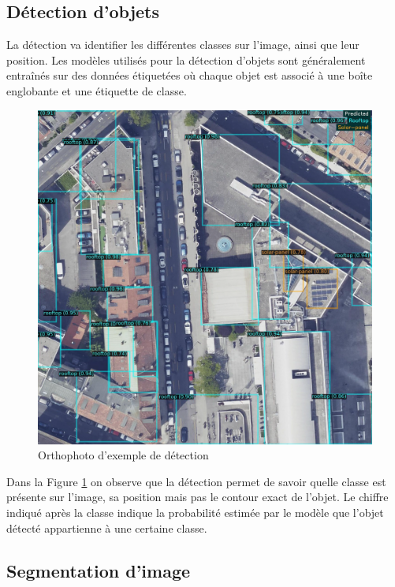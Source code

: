 \subsection{Détection d'objets}
La détection va identifier les différentes classes sur l'image, ainsi que leur position. Les modèles utilisés pour la détection d'objets sont généralement entraînés sur des données étiquetées où chaque objet est associé à une boîte englobante et une étiquette de classe.

\begin{figure}[H]
    \centering
    \includegraphics[width=1\linewidth]{03-tail//A1_fondamentaux_ML//A1_figures/A1_25_detection_hepia.png}
    \caption{Orthophoto d'exemple de détection}
    \label{fig:A1_25_detection_hepia}
\end{figure}

Dans la Figure \ref{fig:A1_25_detection_hepia} on observe que la détection permet de savoir quelle classe est présente sur l'image, sa position mais pas le contour exact de l'objet. Le chiffre indiqué après la classe indique la probabilité estimée par le modèle que l'objet détecté appartienne à une certaine classe.

\subsection{Segmentation d'image}
\label{subsec:segmentation_image}

